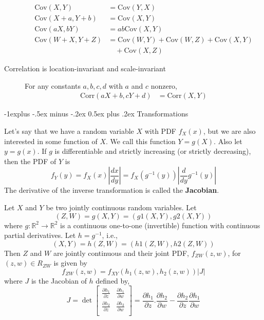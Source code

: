\documentclass[10pt,landscape]{article}
\makeatletter
\newcommand{\cov}{\textrm{Cov}}
\newcommand{\corr}{\textrm{Corr}}
\renewcommand{\subsection}{\@startsection{subsection}{2}{0mm}%
                                {-1explus -.5ex minus -.2ex}%
                                {0.5ex plus .2ex}%
                                {\normalfont\normalsize\bfseries}}
\makeatother
\begin{document}
\begin{multicols*}{3}
\begin{description}
        \begin{align*}
            \cov(X, Y)         & = \cov(Y, X)                           \\
            \cov(X + a, Y + b) & = \cov(X, Y)                           \\
            \cov(aX, bY)       & = ab\cov(X, Y)                         \\
            \cov(W + X, Y + Z) & = \cov(W, Y) + \cov(W, Z) + \cov(X, Y) \\
                               & \quad + \cov(X, Z)                     
        \end{align*}
        \item [Correlation is location-invariant and scale-invariant] For any constants $a,b,c,d$ with $a$ and $c$ nonzero,
        \begin{align*}
            \corr(aX + b, cY + d) & = \corr(X, Y) 
        \end{align*}
    \end{description}
            
    \subsection{Transformations}
    \begin{description}
        \label{one variable transformations}
        \item[One Variable Transformations] Let's say that we have a random variable $X$ with PDF $f_X(x)$, but we are also interested in some function of $X$. We call this function $Y = g(X)$. Also let $y=g(x)$. If $g$ is differentiable and strictly increasing (or strictly decreasing), then the PDF of $Y$ is
        \[
            f_Y(y) = f_X(x)\left|\frac{dx}{dy}\right| = f_X(g^{-1}(y))\left|\frac{d}{dy}g^{-1}(y)\right|
        \]
        The derivative of the inverse transformation is called the \textbf{Jacobian}.
                            
        \item[Two Variable Transformations] 
        Let $X$ and $Y$ be two jointly continuous random variables. Let $$(Z,W)=g(X,Y)=(g1(X,Y),g2(X,Y))$$ 
        where $g:\mathbb{R}^2 \to \mathbb{R}^2 $ is a continuous one-to-one (invertible) function with continuous partial derivatives. Let $h=g^{-1}$, i.e., 
        $$(X,Y)=h(Z,W)=(h1(Z,W),h2(Z,W))$$
        Then $Z$ and $W$ are jointly continuous and their joint PDF, $f_{ZW}(z,w)$, for $(z,w) \in R_{ZW}$ is given by
        $$f_{ZW}(z,w)=f_{XY}(h_1(z,w),h_2(z,w))|J|$$
        where $J$ is the Jacobian of $h$ defined by,
        $$
        J = \det  \begin{bmatrix}
        \frac{\partial h_1}{\partial z} & \frac{\partial h_1}{\partial w}  \\
        \frac{\partial h_2}{\partial z}  & \frac{\partial h_2}{\partial w}  \\
        \end{bmatrix}
        = \frac{\partial h_1}{\partial z}.\frac{\partial h_2}{\partial w}-\frac{\partial h_2}{\partial z}\frac{\partial h_1}{\partial w}
        $$
                                

\end{description}
\end{multicols*}
\end{document}
